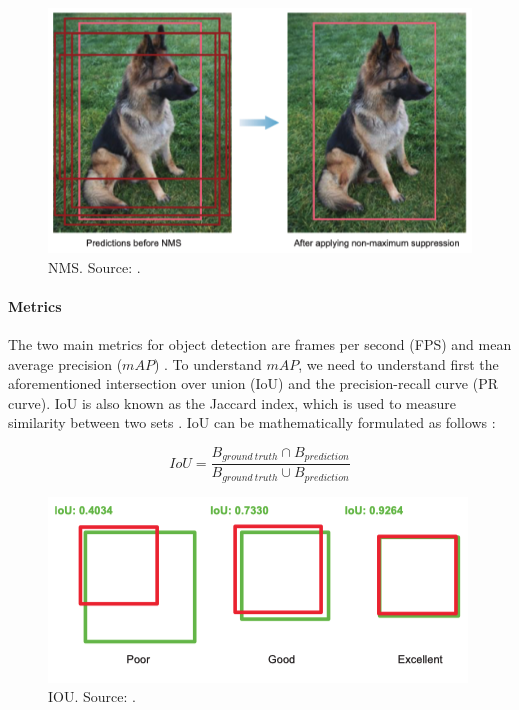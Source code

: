\documentclass[a4paper, 11pt, oneside]{article}
\begin{document}
\begin{figure}[ht]
  \begin{center}
    \includegraphics[width=.8\textwidth]{nms.png}
  \end{center}
  \caption{NMS. Source: \cite{elgendy2020deep}.}
\end{figure}

\paragraph{Metrics}

The two main metrics for object detection are frames per second (FPS) and mean average precision ($mAP$)
\cite{elgendy2020deep, liu2020deep, geron2019hands, planche2019hands}. To understand $mAP$, we need to understand first
the aforementioned intersection over union (IoU) and the precision-recall curve (PR curve). IoU is also known as
the Jaccard index, which is used to measure similarity between two sets \cite{planche2019hands}. IoU can be
mathematically formulated as follows \cite{elgendy2020deep, planche2019hands}:

$$IoU = \frac{B_{ground \ truth} \cap B_{prediction}}{B_{ground \ truth} \cup B_{prediction}}$$

\begin{figure}[ht]
  \begin{center}
    \includegraphics[width=.6\textwidth]{iou.png}
  \end{center}
  \caption{IOU. Source: \cite{elgendy2020deep}.}
\end{figure}
\end{document}
